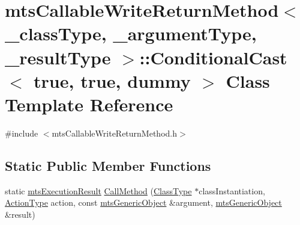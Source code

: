\hypertarget{classmts_callable_write_return_method_1_1_conditional_cast_3_01true_00_01true_00_01dummy_01_4}{\section{mts\-Callable\-Write\-Return\-Method$<$ \-\_\-class\-Type, \-\_\-argument\-Type, \-\_\-result\-Type $>$\-:\-:Conditional\-Cast$<$ true, true, dummy $>$ Class Template Reference}
\label{classmts_callable_write_return_method_1_1_conditional_cast_3_01true_00_01true_00_01dummy_01_4}
}


{\ttfamily \#include $<$mts\-Callable\-Write\-Return\-Method.\-h$>$}

\subsection*{Static Public Member Functions}
\begin{DoxyCompactItemize}
\item 
static \hyperlink{classmts_execution_result}{mts\-Execution\-Result} \hyperlink{classmts_callable_write_return_method_1_1_conditional_cast_3_01true_00_01true_00_01dummy_01_4_a7ab0712c4bd119b0ac88f0879d65f547}{Call\-Method} (\hyperlink{classmts_callable_write_return_method_a51dbe6298941ab172d83182c8188092d}{Class\-Type} $\ast$class\-Instantiation, \hyperlink{classmts_callable_write_return_method_a0b5f9726e52abdb0790ccd8c217591b2}{Action\-Type} action, const \hyperlink{classmts_generic_object}{mts\-Generic\-Object} \&argument, \hyperlink{classmts_generic_object}{mts\-Generic\-Object} \&result)
\end{DoxyCompactItemize}


